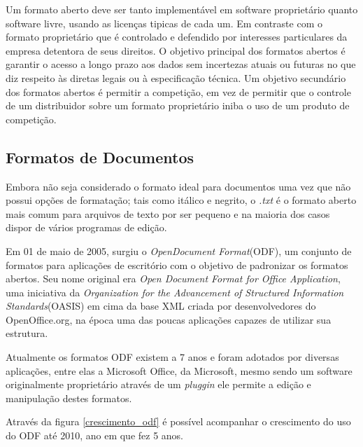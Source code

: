 Um formato aberto deve ser tanto implementável em software proprietário quanto software livre, usando as licenças tipicas de cada um. Em contraste com o formato proprietário que é controlado e defendido por interesses particulares da empresa detentora de seus direitos. O objetivo principal dos formatos abertos é garantir o acesso a longo prazo aos dados sem incertezas atuais ou futuras no que diz respeito às diretas legais ou à especificação técnica. Um objetivo secundário dos formatos abertos é permitir a competição, em vez de permitir que o controle de um distribuidor sobre um formato proprietário iniba o uso de um produto de competição.

\subsection{Formatos de Documentos}

Embora não seja considerado o formato ideal para documentos uma vez que não possui opções de formatação; tais como itálico e negrito, o \textit{.txt} é o formato aberto mais comum para arquivos de texto por ser pequeno e na maioria dos casos dispor de vários programas de edição.

Em 01 de maio de 2005, surgiu o \textit{OpenDocument Format}(ODF), um conjunto de formatos para aplicações de escritório com o objetivo de padronizar os formatos abertos. Seu nome original era \textit{Open Document Format for Office Application}, uma iniciativa da \textit{Organization for the Advancement of Structured Information Standards}(OASIS) em cima da base XML criada por desenvolvedores do OpenOffice.org, na época uma das poucas aplicações capazes de utilizar sua estrutura.

Atualmente os formatos ODF existem a 7 anos e foram adotados por diversas aplicações, entre elas a Microsoft Office, da Microsoft, mesmo sendo um software originalmente proprietário através de um \textit{pluggin} ele permite a edição e manipulação destes formatos.

Através da figura \ref{crescimento_odf} é possível acompanhar o crescimento do uso do ODF até 2010, ano em que fez 5 anos.

